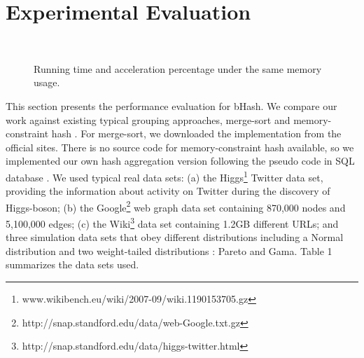 \section{Experimental Evaluation}

\begin{figure}%
    \centering
    \ \
    \hspace{1pt}
    \ \
    \hspace{1pt}
    \ \
    \caption{Running time and acceleration percentage under the same memory usage.}\label{fig:Running time and acceleration}
\end{figure}

This section presents the performance evaluation for bHash. We compare our work against existing typical grouping approaches, merge-sort \cite{dean2008mapreduce} and memory-constraint hash \cite{bartholomew2012mariadb}. For merge-sort, we downloaded the implementation from the official sites. There is no source code for memory-constraint hash available, so we implemented our own hash aggregation version following the pseudo code in SQL database \cite{HashAggregate15}. We used typical real data sets:  (a) the Higgs\footnote{www.wikibench.eu/wiki/2007-09/wiki.1190153705.gz} Twitter data set, providing the information about activity on Twitter during the discovery of Higgs-boson; (b) the Google\footnote{http://snap.standford.edu/data/web-Google.txt.gz} web graph data set containing 870,000 nodes and 5,100,000 edges; (c) the Wiki\footnote{http://snap.standford.edu/data/higgs-twitter.html} data set containing 1.2GB different URLs; and three simulation data sets that obey different distributions including a Normal distribution and two weight-tailed distributions : Pareto and Gama. Table 1 summarizes the data sets used.

